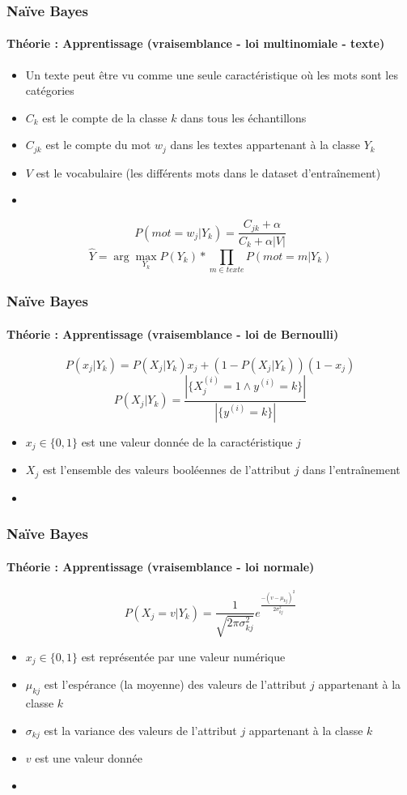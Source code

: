\documentclass[xcolor=table]{beamer}
\begin{document}
\begin{frame}
	\frametitle{Naïve Bayes}
	\framesubtitle{Théorie : Apprentissage (vraisemblance - loi multinomiale - texte)}
	
	\begin{itemize}
		\item Un texte peut être vu comme une seule caractéristique où les mots sont les catégories
		\item $C_k$ est le compte de la classe $k$ dans tous les échantillons
		\item $C_{jk}$ est le compte du mot $w_j$ dans les textes appartenant à la classe $Y_k$
		\item $V$ est le vocabulaire (les différents mots dans le dataset d'entraînement)
		\item {}
	\end{itemize}
	
	\[P(mot = w_j|Y_k) = \frac{C_{jk} + \alpha}{C_k + \alpha |V|}\]
	\[\hat{Y} = \arg\max_{Y_k} P(Y_k) * \prod_{m \in texte} P(mot = m|Y_k)\]
	
\end{frame}

\begin{frame}
	\frametitle{Naïve Bayes}
	\framesubtitle{Théorie : Apprentissage (vraisemblance - loi de Bernoulli)}
	
	\[P(x_j|Y_k) = P(X_j|Y_k) x_j + (1-P(X_j|Y_k)) (1-x_j)\]
	\[P(X_j|Y_k) = \frac{|\{X_j^{(i)} = 1 \wedge y^{(i)} = k\}|}{|\{y^{(i)} = k\}|}\]
	\begin{itemize}
		\item $x_j \in \{0, 1\}$ est une valeur donnée de la caractéristique $j$
		\item $X_j$ est l'ensemble des valeurs booléennes de l'attribut $j$ dans l'entraînement
		\item {}
	\end{itemize}
	
	
\end{frame}

\begin{frame}
	\frametitle{Naïve Bayes}
	\framesubtitle{Théorie : Apprentissage (vraisemblance - loi normale)}
	
	\[P(X_j = v|Y_k) = \frac{1}{\sqrt{2\pi \sigma_{kj}^2}} e^\frac{-(v-\mu_{kj})^2}{2 \sigma_{kj}^2}\]
	\begin{itemize}
		\item $x_j \in \{0, 1\}$ est représentée par une valeur numérique
		\item $\mu_{kj}$ est l'espérance (la moyenne) des valeurs de l'attribut $j$ appartenant à la classe $k$
		\item $\sigma_{kj}$ est la variance des valeurs de l'attribut $j$ appartenant à la classe $k$
		\item $v$ est une valeur donnée
		\item {}
	\end{itemize}
	
	
\end{frame}
\end{document}
